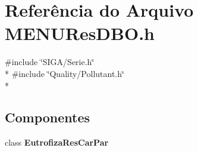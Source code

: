 \section{Referência do Arquivo M\+E\+N\+U\+Res\+D\+B\+O.\+h}
\label{_m_e_n_u_res_d_b_o_8h}
{\ttfamily \#include \char`\"{}S\+I\+G\+A/\+Serie.\+h\char`\"{}}\\*
{\ttfamily \#include \char`\"{}Quality/\+Pollutant.\+h\char`\"{}}\\*
\subsection*{Componentes}
\begin{DoxyCompactItemize}
\item 
class {\bf Eutrofiza\+Res\+Car\+Par}
\end{DoxyCompactItemize}

